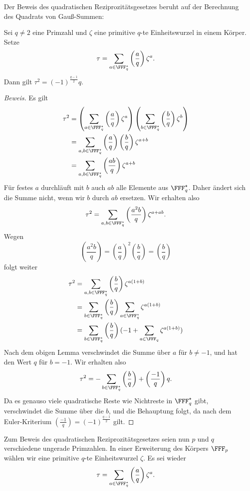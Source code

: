 \documentclass[12pt,a4paper,twoside]{article}
\begin{document}
Der Beweis des quadratischen Reziprozit\"atsgesetzes beruht auf der Berechnung
des Quadrats von Gau\ss-Summen:
\begin{Satz}
  Sei $q\ne2$ eine Primzahl und $\zeta$ eine primitive $q$-te Einheitswurzel in
einem K\"orper. Setze
\[
\tau=\sum_{a\in\FFF_q^\star}\left(\frac{a}{q}\right)\zeta^a.
\]
Dann gilt $\tau^2=(-1)^{\frac{q-1}{2}}q$.
\end{Satz}
\begin{proof}[Beweis]
  Es gilt
  \begin{align*}
    \tau^2 &=
    \left(\sum_{a\in\FFF_q^\star}\left(\frac{a}{q}\right)\zeta^a\right)
    \left(\sum_{b\in\FFF_q^\star}\left(\frac{b}{q}\right)\zeta^b\right)\\
&=
    \sum_{a,b\in\FFF_q^\star}\left(\frac{a}{q}\right)
    \left(\frac{b}{q}\right)\zeta^{a+b}\\
&= \sum_{a,b\in\FFF_q^\star}\left(\frac{ab}{q}\right)
    \zeta^{a+b}
  \end{align*}
  F\"ur festes $a$ durchl\"auft mit $b$ auch $ab$ alle Elemente aus
  $\FFF_q^\star$. Daher \"andert sich die Summe nicht, wenn wir $b$ durch $ab$
  ersetzen. Wir erhalten also
\[
\tau^2 = \sum_{a,b\in\FFF_q^\star}\left(\frac{a^2b}{q}\right)
    \zeta^{a+ab}.
\]
Wegen
\[
\left(\frac{a^2b}{q}\right)=
\left(\frac{a}{q}\right)^2\left(\frac{b}{q}\right)= \left(\frac{b}{q}\right)
\]
folgt weiter
\begin{align*}
  \tau^2 &=
  \sum_{a,b\in\FFF_q^\star}\left(\frac{b}{q}\right)
    \zeta^{a(1+b)}\\
&= \sum_{b\in\FFF_q^\star}\left(\frac{b}{q}\right) \sum_{a\in\FFF_q^\star}
  \zeta^{a(1+b)}\\
&=  \sum_{b\in\FFF_q^\star}\left(\frac{b}{q}\right) (-1+\sum_{a\in\FFF_q}
  \zeta^{a(1+b)})
\end{align*}
Nach dem obigen Lemma verschwindet die Summe \"uber $a$ f\"ur $b\ne-1$, und
hat den Wert $q$ f\"ur $b=-1$. Wir erhalten also
\[
\tau^2=
-\sum_{b\in\FFF_q^\star}\left(\frac{b}{q}\right)+\left(\frac{-1}{q}\right)q.
\]
Da es genauso viele quadratische Reste wie Nichtreste in $\FFF_q^\star$ gibt,
verschwindet die Summe \"uber die $b$, und die Behauptung folgt, da nach dem
Euler-Kriterium $\left(\frac{-1}{q}\right)=(-1)^{\frac{q-1}{2}}$ gilt.
\end{proof}
Zum Beweis des quadratischen Reziprozit\"atsgesetzes seien nun $p$ und $q$
verschiedene ungerade Primzahlen. In einer Erweiterung des K\"orpers $\FFF_p$
w\"ahlen wir eine primitive $q$-te Einheitswurzel $\zeta$. Es sei wieder
\[
\tau=\sum_{a\in\FFF_q^\star}\left(\frac{a}{q}\right)\zeta^a.
\]
\end{document}

